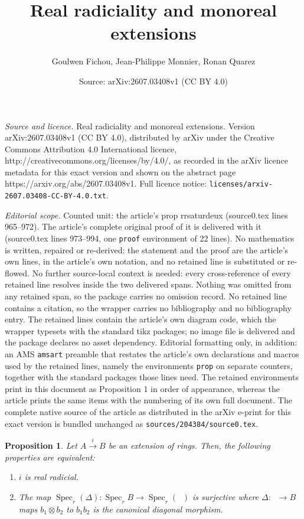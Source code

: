 \documentclass[10pt,a4paper]{amsart}
\title{Real radiciality and monoreal extensions}
\author{Goulwen Fichou, Jean-Philippe Monnier, Ronan Quarez}
\date{Source: arXiv:2607.03408v1 (CC BY 4.0)}
\newtheorem{prop}{Proposition}
\DeclareMathOperator{\BAB}{B\otimes_{A} B}
\DeclareMathOperator{\Sp}{Spec}
\begin{document}
\maketitle

\noindent\emph{Source and licence.} Real radiciality and monoreal extensions. Version arXiv:2607.03408v1 (CC BY 4.0), distributed by arXiv under the Creative Commons Attribution 4.0 International licence, http://creativecommons.org/licenses/by/4.0/, as recorded in the arXiv licence metadata for this exact version and shown on the abstract page https://arxiv.org/abs/2607.03408v1. Full licence notice: \texttt{licenses/arxiv-2607.03408-CC-BY-4.0.txt}.\par\smallskip

\noindent\textit{Editorial scope.} Counted unit: the article's prop rrsaturdeux (source0.tex lines 965--972). The article's complete original proof of it is delivered with it (source0.tex lines 973--994, one \texttt{proof} environment of 22 lines). No mathematics is written, repaired or re-derived: the statement and the proof are the article's own lines, in the article's own notation, and no retained line is substituted or re-flowed.  No further source-local context is needed: every cross-reference of every retained line resolves inside the two delivered spans.  Nothing was omitted from any retained span, so the package carries no omission record.  No retained line contains a citation, so the wrapper carries no bibliography and no bibliography entry.  The retained lines contain the article's own diagram code, which the wrapper typesets with the standard tikz packages; no image file is delivered and the package declares no asset dependency.  Editorial formatting only, in addition: an AMS \texttt{amsart} preamble that restates the article's own declarations and macros used by the retained lines, namely the environments \texttt{prop} on separate counters, together with the standard packages those lines need.  The retained environments print in this document as Proposition 1 in order of appearance, whereas the article prints the same items with the numbering of its own full document.  The complete native source of the article as distributed in the arXiv e-print for this exact version is bundled unchanged as \texttt{sources/204384/source0.tex}.
\begin{prop}\label{rrsaturdeux}
Let $A\xrightarrow{i}  B$ be an extension of rings. Then, the following properties are equivalent:
\begin{enumerate}
\item $i$ is  real radicial.
\item The map $\Sp_r (\Delta):\Sp_r B\to \Sp_r (\BAB)$ is surjective where $\Delta:\BAB\to B$ maps $b_1\otimes b_2$ to $b_1b_2$ is the canonical diagonal morphism.
\end{enumerate}
\end{prop}
\end{document}
